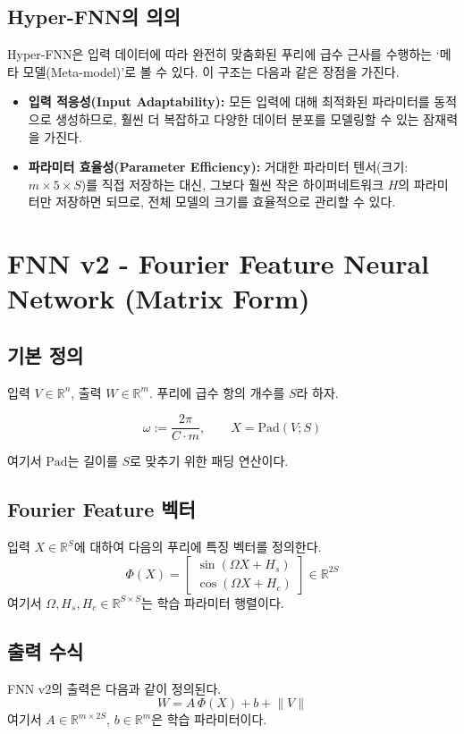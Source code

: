 \documentclass{book}
\begin{document}
\section{Hyper-FNN의 의의}

Hyper-FNN은 입력 데이터에 따라 완전히 맞춤화된 푸리에 급수 근사를 수행하는 `메타 모델(Meta-model)'로 볼 수 있다. 이 구조는 다음과 같은 장점을 가진다.

\begin{itemize}
    \item \textbf{입력 적응성(Input Adaptability):} 모든 입력에 대해 최적화된 파라미터를 동적으로 생성하므로, 훨씬 더 복잡하고 다양한 데이터 분포를 모델링할 수 있는 잠재력을 가진다.
    \item \textbf{파라미터 효율성(Parameter Efficiency):} 거대한 파라미터 텐서(크기: $m \times 5 \times S$)를 직접 저장하는 대신, 그보다 훨씬 작은 하이퍼네트워크 $H$의 파라미터만 저장하면 되므로, 전체 모델의 크기를 효율적으로 관리할 수 있다.
\end{itemize}

\chapter{FNN v2 - Fourier Feature Neural Network (Matrix Form)}

\section{기본 정의}
입력 $V \in \mathbb{R}^n$, 출력 $W \in \mathbb{R}^m$.
푸리에 급수 항의 개수를 $S$라 하자.

\[
\omega := \frac{2\pi}{C \cdot m}, \qquad
X = \text{Pad}(V; S)
\]

여기서 $\text{Pad}$는 길이를 $S$로 맞추기 위한 패딩 연산이다.

\section{Fourier Feature 벡터}
입력 $X \in \mathbb{R}^S$에 대하여 다음의 푸리에 특징 벡터를 정의한다.
\[
\Phi(X) =
\begin{bmatrix}
\sin(\Omega X + H_s) \\
\cos(\Omega X + H_c)
\end{bmatrix}
\in \mathbb{R}^{2S}
\]
여기서 $\Omega, H_s, H_c \in \mathbb{R}^{S \times S}$는 학습 파라미터 행렬이다.

\section{출력 수식}
FNN v2의 출력은 다음과 같이 정의된다.
\[
W = A \, \Phi(X) + b + \lVert V \rVert
\]
여기서 $A \in \mathbb{R}^{m \times 2S}$, $b \in \mathbb{R}^m$은 학습 파라미터이다.
\end{document}
